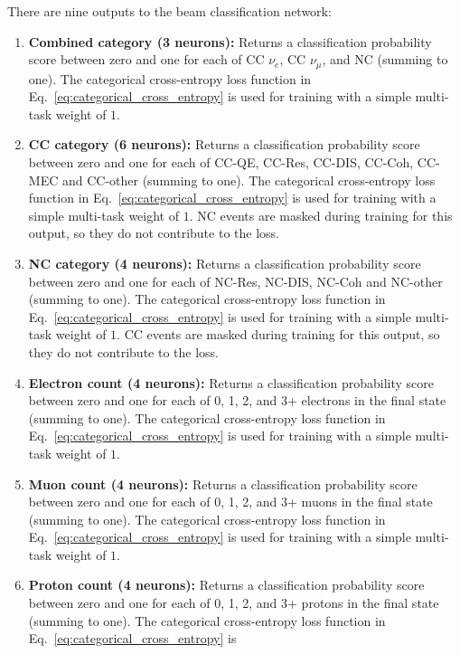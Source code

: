 There are nine outputs to the beam classification network:
\begin{enumerate}
    \item \textbf{Combined category (3 neurons):} Returns a classification probability score
          between zero and one for each of CC $\nu_{e}$, CC $\nu_{\mu}$, and NC (summing to one).
          The categorical cross-entropy loss function in Eq.~\ref{eq:categorical_cross_entropy} is
          used for training with a simple multi-task weight of $1$.
    \item \textbf{CC category (6 neurons):} Returns a classification probability score between
          zero and one for each of CC-QE, CC-Res, CC-DIS, CC-Coh, CC-MEC and CC-other (summing to
          one). The categorical cross-entropy loss function in
          Eq.~\ref{eq:categorical_cross_entropy} is used for training with a simple multi-task
          weight of $1$. NC events are masked during training for this output, so they do not
          contribute to the loss.
    \item \textbf{NC category (4 neurons):} Returns a classification probability score between
          zero and one for each of NC-Res, NC-DIS, NC-Coh and NC-other (summing to one). The
          categorical cross-entropy loss function in Eq.~\ref{eq:categorical_cross_entropy} is
          used for training with a simple multi-task weight of $1$. CC events are masked during
          training for this output, so they do not contribute to the loss.
    \item \textbf{Electron count (4 neurons):} Returns a classification probability score between
          zero and one for each of 0, 1, 2, and 3+ electrons in the final state (summing to one).
          The categorical cross-entropy loss function in Eq.~\ref{eq:categorical_cross_entropy} is
          used for training with a simple multi-task weight of $1$.
    \item \textbf{Muon count (4 neurons):} Returns a classification probability score between zero
          and one for each of 0, 1, 2, and 3+ muons in the final state (summing to one). The
          categorical cross-entropy loss function in Eq.~\ref{eq:categorical_cross_entropy} is
          used for training with a simple multi-task weight of $1$.
    \item \textbf{Proton count (4 neurons):} Returns a classification probability score between
          zero and one for each of 0, 1, 2, and 3+ protons in the final state (summing to one).
          The categorical cross-entropy loss function in Eq.~\ref{eq:categorical_cross_entropy} is

\end{enumerate}
